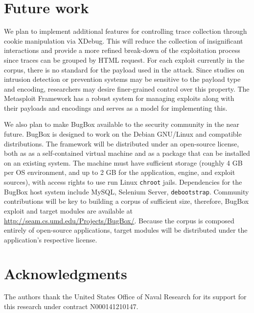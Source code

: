 \documentclass[letterpaper,twocolumn,10pt]{article}
\begin{document}
\section{Future work}
We plan to implement additional features for controlling trace collection through cookie manipulation via XDebug. This will reduce the collection of insignificant interactions and provide a more refined break-down of the exploitation process since traces can be grouped by HTML request. For each exploit currently in the corpus, there is no standard for the payload used in the attack. Since studies on intrusion detection or prevention systems may be sensitive to the payload type and encoding, researchers may desire finer-grained control over this property. The Metasploit Framework has a  robust system for managing exploits along with their payloads and encodings and serves as a model for implementing this.

We also plan to make BugBox available to the security community in the near future. BugBox is designed to work on the Debian GNU/Linux and compatible distributions.  The framework will be distributed under an open-source license, both as as a self-contained virtual machine and as a package that can be installed on an existing system. The machine must have sufficient storage (roughly 4 GB per OS environment, and up to 2 GB for the application, engine, and exploit sources), with access rights to use run Linux {\tt chroot} jails.  Dependencies for the BugBox host system include MySQL, Selenium Server, \texttt{debootstrap}. Community contributions will be key to building a corpus of sufficient size, therefore, BugBox exploit and target modules are available at \url{http://seam.cs.umd.edu/Projects/BugBox/}. Because the corpus is composed entirely of open-source applications, target modules will be distributed under the application's respective license.

\section*{Acknowledgments}

The authors thank the United States Office of Naval Research for its support for this research under contract N000141210147.

{\footnotesize 
}
\end{document}
